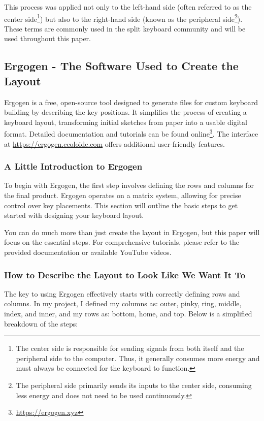 \documentclass[a4paper,12pt]{article}
\begin{document}
This process was applied not only to the left-hand side (often referred to as the center side\footnote{The center side is responsible for sending signals from both itself and the peripheral side to the computer. Thus, it generally consumes more energy and must always be connected for the keyboard to function.}) but also to the right-hand side (known as the peripheral side\footnote{The peripheral side primarily sends its inputs to the center side, consuming less energy and does not need to be used continuously.}). These terms are commonly used in the split keyboard community and will be used throughout this paper.

\subsection{Ergogen - The Software Used to Create the Layout}

Ergogen is a free, open-source tool designed to generate files for custom keyboard building by describing the key positions. It simplifies the process of creating a keyboard layout, transforming initial sketches from paper into a usable digital format. Detailed documentation and tutorials can be found online\footnote{\url{https://ergogen.xyz}}. The interface at \url{https://ergogen.ceoloide.com} offers additional user-friendly features.

\subsubsection{A Little Introduction to Ergogen}

To begin with Ergogen, the first step involves defining the rows and columns for the final product. Ergogen operates on a matrix system, allowing for precise control over key placements. This section will outline the basic steps to get started with designing your keyboard layout.

You can do much more than just create the layout in Ergogen, but this paper will focus on the essential steps. For comprehensive tutorials, please refer to the provided documentation or available YouTube videos.

\subsubsection{How to Describe the Layout to Look Like We Want It To}

The key to using Ergogen effectively starts with correctly defining rows and columns. In my project, I defined my columns as: outer, pinky, ring, middle, index, and inner, and my rows as: bottom, home, and top. Below is a simplified breakdown of the steps:
\end{document}

